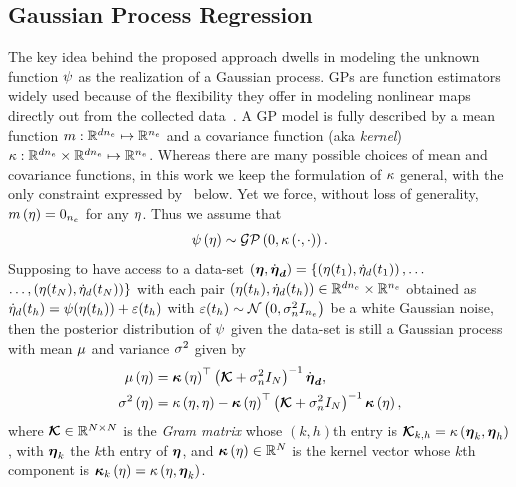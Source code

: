 \subsection{Gaussian Process Regression}%
\label{SEC:OR-POST-PROCESSING-GAUSSIAN-INFERENCE}
The key idea behind the proposed approach dwells in modeling the unknown function $\psi$ as the realization of a Gaussian process.
GPs are function estimators widely used because of the flexibility they offer in modeling nonlinear maps directly out from the collected data~\cite{rasmussen2003gaussian}.
A GP model is fully described by a mean function $m: \mathbb{R}^{d n_{e}} \mapsto \mathbb{R}^{n_{e}}$ and a covariance function (aka \textit{kernel})
$\kappa: \mathbb{R}^{d n_{e}} \times \mathbb{R}^{d n_{e}} \mapsto \mathbb{R}^{n_{e}}$. Whereas there are many possible choices of mean and covariance functions, in this work we keep 
the formulation of $\kappa$ general, with the only constraint expressed by~ below.
Yet we force, without loss of generality, $m \left( \eta \right) = 0_{n_{e}}$ for any $\eta$. Thus we assume that
\begin{equation*}
   \psi \left( \eta \right) \sim \mathcal{GP} \left( 0, \kappa \left( \cdot, \cdot \right) \right).
\end{equation*}
Supposing to have access to a data-set
$\left( \boldsymbol{\eta}, \dot{\boldsymbol{\eta}}_{\boldsymbol{d}} \right) = \{ \left( \eta(t_1), \dot{\eta}_d(t_1) \right), \dots$
$\dots, \left( \eta(t_{N}), \dot{\eta}_d(t_{N}) \right) \}$ with each pair
$\left( \eta(t_h), \dot{\eta}_d(t_h) \right) \in \mathbb{R}^{d n_{e}} \times \mathbb{R}^{n_{e}}$ obtained as
$\dot{\eta}_d(t_h) = \psi(\eta(t_h)) + \varepsilon(t_h)$ with
$\varepsilon(t_h) \sim \mathcal{N} \left( 0, \sigma_n^2 I_{n_{e}}\right)$ be a white Gaussian noise, then the posterior distribution of $\psi$ given the data-set is still
a Gaussian process with mean $\mu$ and variance $\sigma^2$ given by~\cite{rasmussen2003gaussian}
\begin{equation}%
   \label{EQ:OR-POST-PROCESSING-GP-POSTERIOR}
   \begin{split}
      \pmu \lp \im \rp & = \kv \lp \im \rp\T \lp\km + \nn I_{N}\rp^{-1}\sty, \\
      \pvar \lp \im \rp & = \kf \lp \im, \im \rp - \kv \lp \im \rp \T \lp\km + \nn I_{N}\rp^{-1}\kv \lp \im \rp,
   \end{split}
\end{equation}
where $\boldsymbol{\mathcal{K}} \in \mathbb{R}^{N \times N}$ is the \textit{Gram matrix} whose $(k,h)$th entry is $\boldsymbol{\mathcal{K}}_{k,h} = \kappa \left( \boldsymbol{\eta}_k, \boldsymbol{\eta}_h \right)$,
with $\boldsymbol{\eta}_k$ the $k$th entry of $\boldsymbol{\eta}$, and $\boldsymbol{\kappa} \left( \eta \right) \in \mathbb{R}^{N}$ is the kernel vector whose $k$th component is $\boldsymbol{\kappa}_k \left( \eta \right) = \kappa \left( \eta, \boldsymbol{\eta}_k \right)$.
